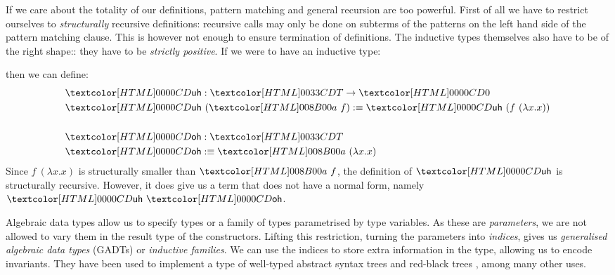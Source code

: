 If we care about the totality of our definitions, pattern matching and
general recursion are too powerful. First of all we have to restrict
ourselves to \emph{structurally} recursive definitions: recursive
calls may only be done on subterms of the patterns on the left hand
side of the pattern matching clause. This is however not enough to
ensure termination of definitions. The inductive types themselves also
have to be of the right shape:: they have to be \emph{strictly
positive}. If we were to have an inductive type:
%
\begin{datatype}{\Tty}{\Type}
  \constr{\Ta}{(\Tty \to \Tty) \to \Tty}
\end{datatype}
then we can define:
%
\begin{align*}
  &\uh : \Tty \to \emptyty \\
  &\uh\ (\Ta\ f) \ddefeq \uh\ (f\ (\lambda x . x)) \\
  \\
  &\oh : \Tty \\
  &\oh \ddefeq \Ta\ (\lambda x . x)
\end{align*}
%
Since $f\ (\lambda x . x)$ is structurally smaller than $\Ta\ f$, the
definition of $\uh$ is structurally recursive. However, it does give us
a term that does not have a normal form, namely $\uh\ \oh$.

Algebraic data types allow us to specify types or a family of types
parametrised by type variables. As these are \emph{parameters}, we are
not allowed to vary them in the result type of the
constructors. Lifting this restriction, \ie turning the parameters
into \emph{indices}, gives us \emph{generalised algebraic data types}
(GADTs) or \emph{inductive families}. We can use the indices to store
extra information in the type, allowing us to encode invariants. They
have been used to implement a type of well-typed abstract syntax trees
\cite{Pavsalic2004} and red-black trees \cite{Kahrs2001}, among many
other uses.

